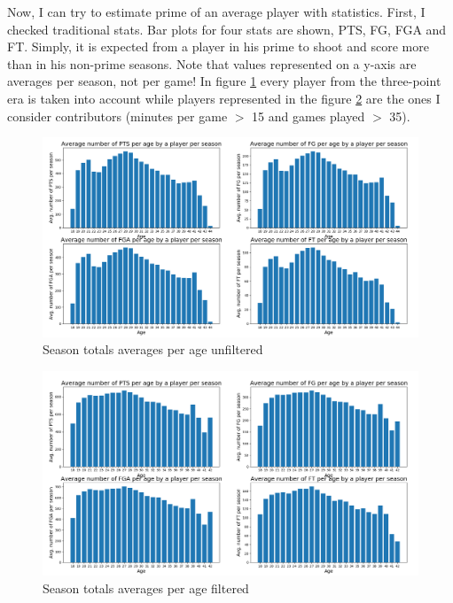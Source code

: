 \documentclass[a4paper]{article}
\begin{document}
Now, I can try to estimate prime of an average player with statistics. First, I checked traditional stats. Bar plots for four stats are shown, PTS, FG, FGA and FT. Simply, it is expected from a player in his prime to shoot and score more than in his non-prime seasons. Note that values represented on a y-axis are averages per season, not per game! In figure \ref{plt:totals_age} every player from the three-point era is taken into account while players represented in the figure \ref{plt:totals_age_filtered} are the ones I consider contributors (minutes per game $>$ 15 and games played $>$ 35).

\begin{figure}[h!]
\begin{center}
\includegraphics[scale=0.3]{traditional_stats_per_age.png}
\end{center}
\caption{Season totals averages per age unfiltered}
\label{plt:totals_age}
\end{figure}

\begin{figure}[h!]
\begin{center}
\includegraphics[scale=0.3]{traditional_stats_per_age_filtered.png}
\end{center}
\caption{Season totals averages per age filtered}
\label{plt:totals_age_filtered}
\end{figure}
\end{document}
